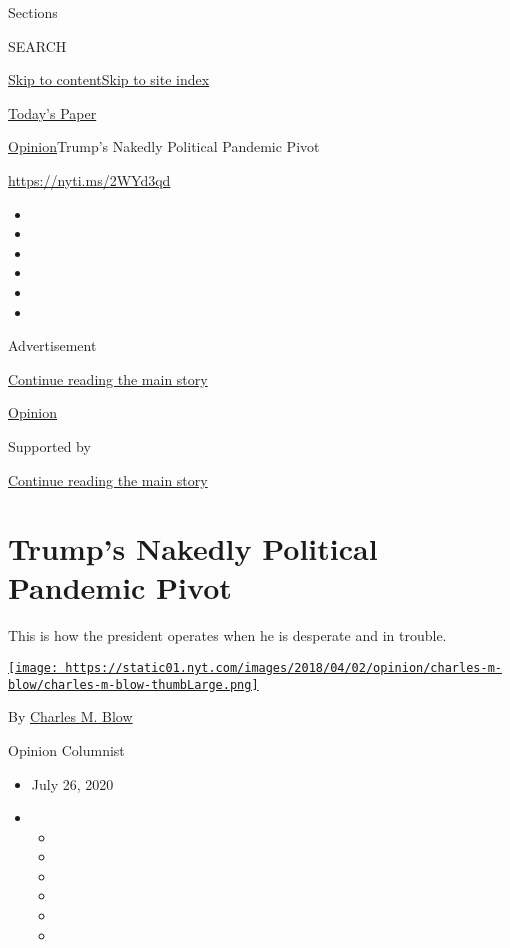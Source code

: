 Sections

SEARCH

\protect\hyperlink{site-content}{Skip to
content}\protect\hyperlink{site-index}{Skip to site index}

\href{https://myaccount.nytimes.com/auth/login?response_type=cookie\&client_id=vi}{}

\href{https://www.nytimes.com/section/todayspaper}{Today's Paper}

\href{/section/opinion}{Opinion}\textbar{}Trump's Nakedly Political
Pandemic Pivot

\href{https://nyti.ms/2WYd3qd}{https://nyti.ms/2WYd3qd}

\begin{itemize}
\item
\item
\item
\item
\item
\item
\end{itemize}

Advertisement

\protect\hyperlink{after-top}{Continue reading the main story}

\href{/section/opinion}{Opinion}

Supported by

\protect\hyperlink{after-sponsor}{Continue reading the main story}

\hypertarget{trumps-nakedly-political-pandemic-pivot}{%
\section{Trump's Nakedly Political Pandemic
Pivot}\label{trumps-nakedly-political-pandemic-pivot}}

This is how the president operates when he is desperate and in trouble.

\href{https://www.nytimes.com/by/charles-m-blow}{\texttt{[image: https://static01.nyt.com/images/2018/04/02/opinion/charles-m-blow/charles-m-blow-thumbLarge.png]}}

By \href{https://www.nytimes.com/by/charles-m-blow}{Charles M. Blow}

Opinion Columnist

\begin{itemize}
\item
  July 26, 2020
\item
  \begin{itemize}
  \item
  \item
  \item
  \item
  \item
  \item
  \end{itemize}
\end{itemize}

